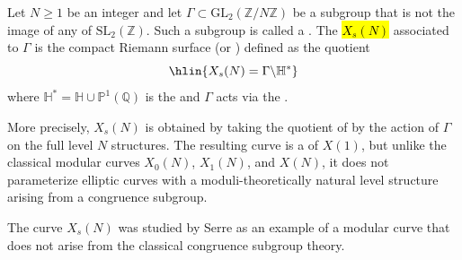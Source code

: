 \begin{definition} \label{definition:X_s_N_nonclassical_modular_curve_quotient_by_noncongruence_subgroup}
Let $N \geq 1$ be an integer and let $\Gamma \subset \mathrm{GL}_2(\mathbb{Z}/N\mathbb{Z})$ be a subgroup that is not the image of any  of $\mathrm{SL}_2(\mathbb{Z})$. Such a subgroup is called a . The  \hl{$X_s(N)$} associated to $\Gamma$ is the compact Riemann surface (or ) defined as the quotient
$$\hlin{X_s(N) = \Gamma \backslash \mathbb{H}^*}$$
where $\mathbb{H}^* = \mathbb{H} \cup \mathbb{P}^1(\mathbb{Q})$ is the  and $\Gamma$ acts via the .

More precisely, $X_s(N)$ is obtained by taking the quotient of  by the action of $\Gamma$ on the full level $N$ structures. The resulting curve is a  of $X(1)$, but unlike the classical modular curves $X_0(N)$, $X_1(N)$, and $X(N)$, it does not parameterize elliptic curves with a moduli-theoretically natural level structure arising from a congruence subgroup.

The curve $X_s(N)$ was studied by Serre as an example of a modular curve that does not arise from the classical congruence subgroup theory.

\end{definition}
